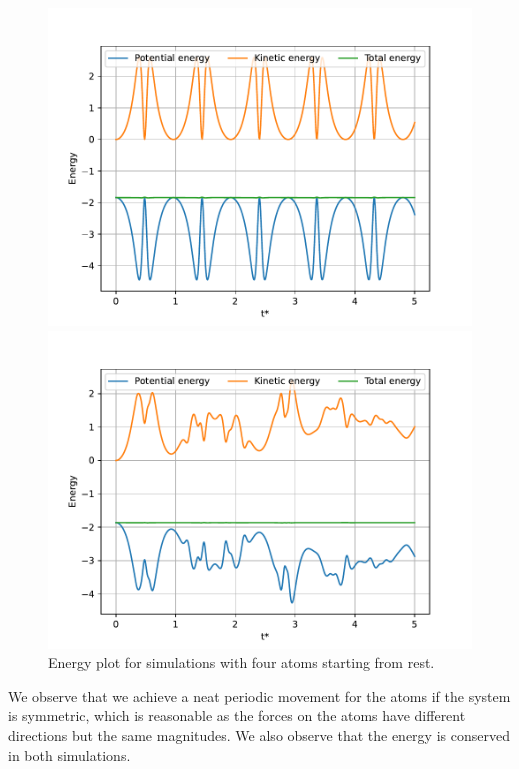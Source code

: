 \documentclass[a4paper,10pt,english]{article}
\begin{document}
\begin{figure}[h]
    \centering
    \begin{minipage}{0.5\textwidth}
        \centering
        \includegraphics[width=1.05\textwidth]{../figures/3_b_iv.pdf}
    \end{minipage}\hfill
    \begin{minipage}{0.5\textwidth}
        \centering
        \includegraphics[width=1.05\textwidth]{../figures/3_b_v.pdf}
    \end{minipage}
    \caption{Energy plot for simulations with four atoms starting from rest.}
    \label{fig:energyplots3}
\end{figure}

We observe that we achieve a neat periodic movement for the atoms if the system is symmetric, which is reasonable as the forces on the atoms have different directions but the same magnitudes. We also observe that the energy is conserved in both simulations.
\end{document}
